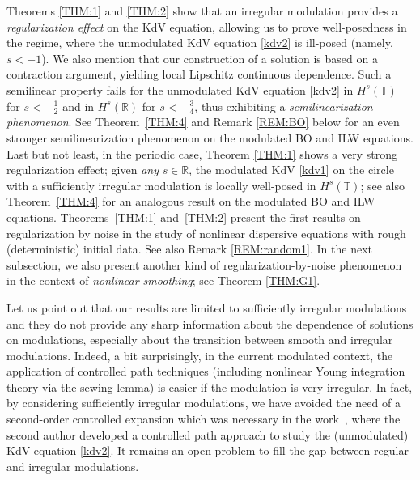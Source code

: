 \documentclass[letterpaper, 11pt,  reqno]{amsart}
\newcommand{\1}{\hspace{0.5mm}\text{I}\hspace{0.5mm}}
\newcommand{\R}{\mathbb{R}}
\newcommand{\T}{\mathbb{T}}
\numberwithin{equation}{section}
\numberwithin{theorem}{section}
\begin{document}
Theorems \ref{THM:1} and \ref{THM:2}
show
that an irregular modulation provides a \emph{regularization effect} on the KdV equation, 
allowing us to prove well-posedness in the regime, where the unmodulated 
KdV equation \eqref{kdv2} is ill-posed
 (namely, $s < -1$).
We also mention that our construction of a solution is based on a contraction argument,
yielding local Lipschitz continuous dependence.
Such a semilinear property fails for 
 the unmodulated 
KdV equation \eqref{kdv2}
in $H^s(\T)$ for $s <  - \frac 12$
and in $H^{s}(\R)$ for $s <  -\frac 34$, 
thus exhibiting a {\it semilinearization phenomenon}.
See Theorem~\ref{THM:4}
and Remark \ref{REM:BO}
below for an even stronger 
semilinearization phenomenon on the modulated BO and  ILW equations.
Last but not least,  in the periodic case, 
Theorem \ref{THM:1} shows 
a very strong regularization effect;
given {\it any} $s \in \R$, 
the modulated KdV \eqref{kdv1}
on  the circle
with a sufficiently irregular modulation
is locally well-posed in $H^s(\T)$; see also Theorem~\ref{THM:4}
for an analogous result on the modulated BO and  ILW equations.
Theorems~\ref{THM:1} and~\ref{THM:2}
present  the first 
results 
on regularization by noise
in 
the study of nonlinear dispersive equations with rough (deterministic) initial data.
See also Remark \ref{REM:random1}.
In the next subsection, 
we also present another kind of regularization-by-noise phenomenon
in the context of 
{\it nonlinear smoothing};
see Theorem \ref{THM:G1}.








Let us point  out that our results are limited to 
sufficiently irregular modulations 
and they do not provide any sharp information about the dependence of solutions on modulations, especially about the transition between smooth and irregular modulations. 
Indeed, a bit surprisingly, in the current modulated context,  the application of 
 controlled path techniques (including nonlinear Young integration theory via the sewing lemma) is easier if the modulation is very irregular. 
In fact, by considering
sufficiently irregular modulations, 
we have avoided the need of  
a second-order controlled expansion which was necessary in
the work~\cite{GubinelliKdV}, where the second author developed a controlled path
approach to study the (unmodulated) KdV equation \eqref{kdv2}.
It remains   an open problem to fill the gap between regular and  irregular modulations. 
\end{document}

